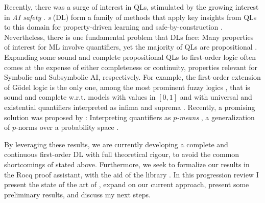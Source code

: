 Recently, there was a surge of interest in QLs, stimulated by the growing interest in \emph{AI safety} \citep{dalrymple2024guaranteedsafeaiframework, davidad24}. \emph{\DL{}s} (DL) form a family of methods that apply key insights from QLs to this domain for property-driven learning and safe-by-construction \InAI{} \citep{FLINKOW2025103280, badreddine2022logic}. Nevertheless, there is one fundamental problem that DLs face: Many properties of interest for ML involve quantifiers, yet the majority of QLs are propositional \citep{bacci2023propositional, metcalfe2008proof, slusarz2023logic}.  Expanding some sound and complete propositional QLs to first-order logic often comes at the expense of either completeness or continuity, properties relevant for Symbolic and Subsymbolic AI, respectively.  For example, the first-order extension of Gödel logic is the only one, among the most prominent fuzzy logics \cite{prooffuzzy,ldl}, that is sound and complete w.r.t. models with values in $[0,1]$ and with universal and existential quantifiers interpreted as infima and suprema \cite{BAAZ200723}. Recently, a promising solution was proposed by \citeauthor{capucci2025quantifiersquantitativereasoning}: Interpreting quantifiers as \textit{$p$-means} \citep{capucci2025quantifiersquantitativereasoning}, a generalization of $p$-norms over a probability space \citep{lpspaces}.  

By leveraging these results, we are currently developing a complete and continuous first-order DL with full theoretical rigour, to avoid the common shortcomings  of \InAI{} stated above. Furthermore, we seek to formalize our results in the Rocq proof assistant, with the aid of the \mathcomp{} library \citep{mathcomp}. In this progression review I present the state of the art of \yada, expand on our current approach, present some preliminary results,  and discuss my next steps. 

